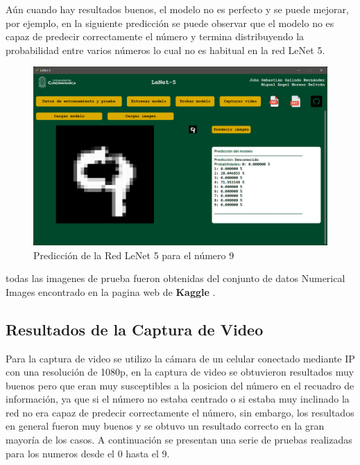 Aún cuando hay resultados buenos, el modelo no es perfecto y se puede mejorar, por ejemplo, en la 
siguiente predicción se puede observar que el modelo no es capaz de predecir correctamente el número y 
termina distribuyendo la probabilidad entre varios números lo cual no es habitual en la red LeNet 5.

\begin{figure}[htbp]
    \centering
    \includegraphics[width=1.05\linewidth]{src/figures/pic_test_image_prob.png}
    \caption{Predicción de la Red LeNet 5 para el número 9}
    \label{fig:Prediction_pic_2}
\end{figure}

todas las imagenes de prueba fueron obtenidas del conjunto de datos Numerical Images encontrado en 
la pagina web de \textbf{Kaggle} \cite{kaggle_data}.

\subsection{Resultados de la Captura de Video}

Para la captura de video se utilizo la cámara de un celular conectado mediante IP con una resolución de 
1080p, en la captura de video se obtuvieron resultados muy buenos pero que eran muy susceptibles a la
posicion del número en el recuadro de información, ya que si el número no estaba centrado o si estaba
muy inclinado la red no era capaz de predecir correctamente el número, sin embargo, los resultados 
en general fueron muy buenos y se obtuvo un resultado correcto en la gran mayoría de los casos.
A continuación se presentan una serie de pruebas realizadas para los numeros desde el 0 hasta el 9.

